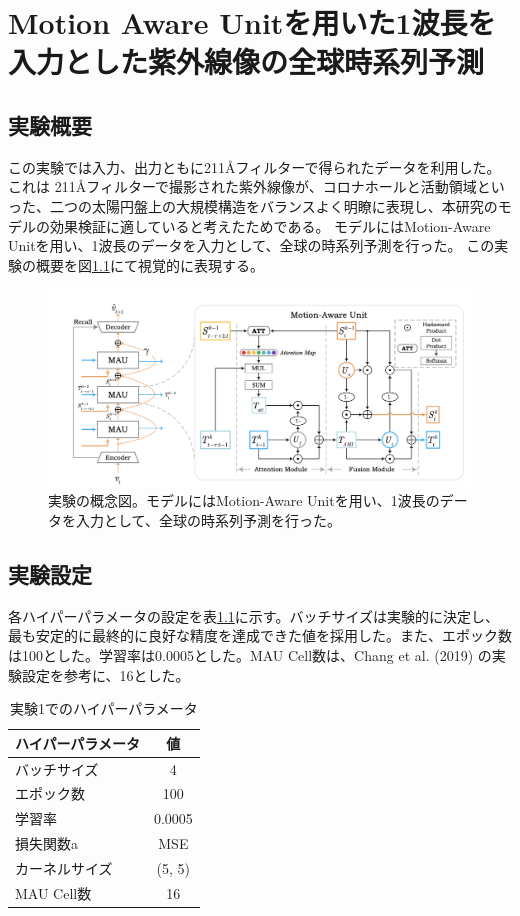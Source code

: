 \chapter{Motion Aware Unitを用いた1波長を入力とした紫外線像の全球時系列予測}
  \section{実験概要}
  この実験では入力、出力ともに211Åフィルターで得られたデータを利用した。
  これは 211Åフィルターで撮影された紫外線像が、コロナホールと活動領域といった、二つの太陽円盤上の大規模構造をバランスよく明瞭に表現し、本研究のモデルの効果検証に適していると考えたためである。
  モデルにはMotion-Aware Unitを用い、1波長のデータを入力として、全球の時系列予測を行った。
  この実験の概要を図\ref{fig:exp1_overview}にて視覚的に表現する。

  \begin{figure}[ht]
    \centering
    \includegraphics[width=150mm]{figures/mau.png}
    \caption{実験の概念図。モデルにはMotion-Aware Unitを用い、1波長のデータを入力として、全球の時系列予測を行った。}
    \label{fig:exp1_overview}
  \end{figure}

  \section{実験設定}
    各ハイパーパラメータの設定を表\ref{tab:exp1_hyperparameters}に示す。バッチサイズは実験的に決定し、最も安定的に最終的に良好な精度を達成できた値を採用した。また、エポック数は100とした。学習率は0.0005とした。MAU Cell数は、Chang et al. (2019) \cite{chang2021mau} の実験設定を参考に、16とした。
    \begin{table}[h]
      \centering
      \begin{tabular}{lc}
      \hline
      ハイパーパラメータ & 値 \\
      \hline\hline
      バッチサイズ & 4 \\
      \hline
      エポック数 & 100 \\
      \hline
      学習率 & 0.0005 \\
      \hline
      損失関数a & MSE \\
      \hline
      カーネルサイズ & (5, 5) \\
      \hline
      MAU Cell数 & 16 \\
      \hline
      \end{tabular}
      \caption{実験1でのハイパーパラメータ}
      \label{tab:exp1_hyperparameters}
    \end{table}



